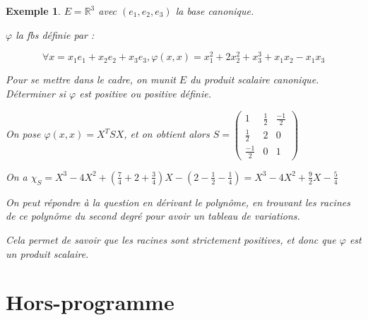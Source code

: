 \documentclass[a4paper,12pt]{book}
\newtheorem{Exe}{Exemple}[section]
\def\R{\mathbb{R}}
\begin{document}
\begin{Exe}
$E=\R^3$ avec $(e_1,e_2,e_3)$ la base canonique.
\par $\varphi$ la fbs définie par :
\par $$\forall x = x_1e_1+x_2e_2+x_3e_3, \varphi(x,x) =x_1^2 + 2x_2^2 + x_3^3+x_1x_2-x_1x_3$$
\par Pour se mettre dans le cadre, on munit $E$ du produit scalaire canonique. Déterminer si $\varphi$ est positive ou positive définie.
\par On pose $\varphi(x,x) = X^TSX$, et on obtient alors $S=\begin{pmatrix}1 & \frac{1}{2} & \frac{-1}{2} \\ \frac{1}{2} & 2 & 0 \\ \frac{-1}{2} & 0 & 1\end{pmatrix}$
\par On a $\chi_S =  X^3 - 4X^2 + (\frac{7}{4}+2+\frac{3}{4})X -(2-\frac{1}{2}-\frac{1}{4}) = X^3-4X^2+ \frac{9}{2}X - \frac{5}{4}$
\par On peut répondre à la question en dérivant le polynôme, en trouvant les racines de ce polynôme du second degré pour avoir un tableau de variations.
\par Cela permet de savoir que les racines sont strictement positives, et donc que $\varphi$ est un produit scalaire.
\end{Exe}


\section{Hors-programme}
\end{document}
